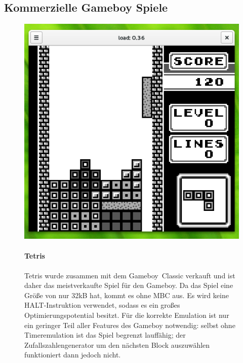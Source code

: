 \documentclass[a4paper]{scrartcl}
\begin{document}
\pagebreak
\subsection{Kommerzielle Gameboy Spiele}

\begin{figure}[H]
  \includegraphics[width=\linewidth]{img/tetris}
\endminipage\hfill
{}
  \paragraph{Tetris}
  Tetris wurde zusammen mit dem Gameboy~Classic verkauft und ist daher das meistverkaufte Spiel für den Gameboy. Da das Spiel eine Größe von nur 32kB hat, kommt es ohne MBC aus. Es wird keine HALT-Instruktion verwendet, sodass es ein großes Optimierungspotential besitzt. Für die korrekte Emulation ist nur ein geringer Teil aller Features des Gameboy notwendig: selbst ohne Timeremulation ist das Spiel begrenzt lauffähig; der Zufallszahlengenerator um den nächsten Block auszuwählen funktioniert dann jedoch nicht.
\endminipage
\end{figure}
\end{document}
